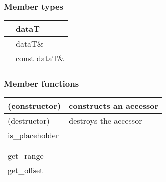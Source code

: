 \documentclass[letterpaper,10pt,english]{sphinxmanual}
\begin{document}
\subsubsection*{Member types}


\begin{savenotes}\sphinxattablestart
\centering
\begin{tabulary}{\linewidth}[t]{|T|T|}
\hline

&
dataT
\\
\hline
{}
&
dataT\&
\\
\hline
{}
&
const dataT\&
\\
\hline
\end{tabulary}
\par
\sphinxattableend\end{savenotes}
\subsubsection*{Member functions}


\begin{savenotes}\sphinxattablestart
\centering
\begin{tabulary}{\linewidth}[t]{|T|T|}
\hline

(constructor)
&
constructs an accessor
\\
\hline
(destructor)
&
destroys the accessor
\\
\hline
is\_placeholder
&\\
\hline
{\hyperref[\detokenize{programming-interface/data/accessor:get-size}]{}}
&\\
\hline
{\hyperref[\detokenize{programming-interface/data/accessor:get-count}]{}}
&\\
\hline
get\_range
&\\
\hline
get\_offset
&\\
\hline
\end{tabulary}
\par
\sphinxattableend\end{savenotes}


\paragraph{}
\label{\detokenize{programming-interface/data/accessor:get-size}}
\begin{sphinxVerbatim}[commandchars=\\\{\}]
  
\end{sphinxVerbatim}
\end{document}
